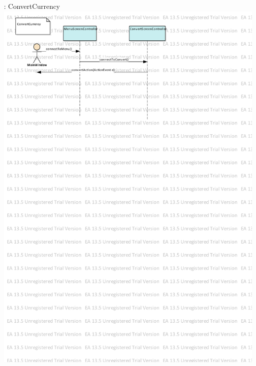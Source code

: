 \documentclass[12pt]{article}
\begin{document}
\begin{enumerate}
 : ConvertCurrency
\newpage
\includegraphics[scale=0.8]{convertCurrency.pdf}
\newpage


\end{enumerate}
\end{document}
